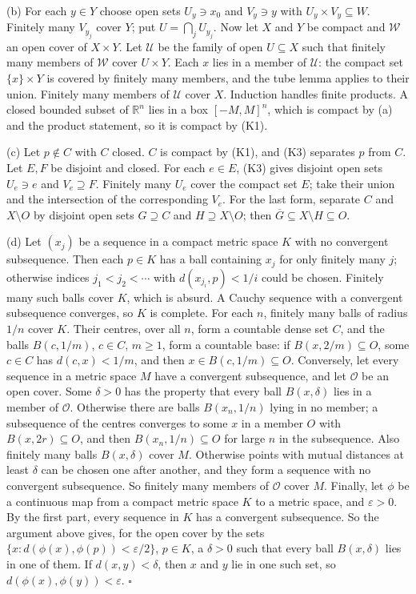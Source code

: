 \documentclass[
  english,
  11pt,
  a4paper,
]{article}
\begin{document}
(b) For each \(y\in Y\) choose open sets \(U_y\ni x_0\) and \(V_y\ni y\)
with \(U_y\times V_y\subseteq W\). Finitely many \(V_{y_j}\) cover
\(Y\); put \(U=\bigcap_jU_{y_j}\). Now let \(X\) and \(Y\) be compact
and \(\mathcal W\) an open cover of \(X\times Y\). Let \(\mathcal U\) be
the family of open \(U\subseteq X\) such that finitely many members of
\(\mathcal W\) cover \(U\times Y\). Each \(x\) lies in a member of
\(\mathcal U\): the compact set \(\{x\}\times Y\) is covered by finitely
many members, and the tube lemma applies to their union. Finitely many
members of \(\mathcal U\) cover \(X\). Induction handles finite
products. A closed bounded subset of \(\mathbb R^n\) lies in a box
\([-M,M]^n\), which is compact by (a) and the product statement, so it
is compact by (K1).

(c) Let \(p\notin C\) with \(C\) closed. \(C\) is compact by (K1), and
(K3) separates \(p\) from \(C\). Let \(E,F\) be disjoint and closed. For
each \(e\in E\), (K3) gives disjoint open sets \(U_e\ni e\) and
\(V_e\supseteq F\). Finitely many \(U_e\) cover the compact set \(E\);
take their union and the intersection of the corresponding \(V_e\). For
the last form, separate \(C\) and \(X\setminus O\) by disjoint open sets
\(G\supseteq C\) and \(H\supseteq X\setminus O\); then
\(\overline G\subseteq X\setminus H\subseteq O\).

(d) Let \((x_j)\) be a sequence in a compact metric space \(K\) with no
convergent subsequence. Then each \(p\in K\) has a ball containing
\(x_j\) for only finitely many \(j\); otherwise indices
\(j_1<j_2<\cdots\) with \(d(x_{j_i},p)<1/i\) could be chosen. Finitely
many such balls cover \(K\), which is absurd. A Cauchy sequence with a
convergent subsequence converges, so \(K\) is complete. For each \(n\),
finitely many balls of radius \(1/n\) cover \(K\). Their centres, over
all \(n\), form a countable dense set \(C\), and the balls \(B(c,1/m)\),
\(c\in C\), \(m\geq1\), form a countable base: if
\(B(x,2/m)\subseteq O\), some \(c\in C\) has \(d(c,x)<1/m\), and then
\(x\in B(c,1/m)\subseteq O\). Conversely, let every sequence in a metric
space \(M\) have a convergent subsequence, and let \(\mathcal O\) be an
open cover. Some \(\delta>0\) has the property that every ball
\(B(x,\delta)\) lies in a member of \(\mathcal O\). Otherwise there are
balls \(B(x_n,1/n)\) lying in no member; a subsequence of the centres
converges to some \(x\) in a member \(O\) with \(B(x,2r)\subseteq O\),
and then \(B(x_n,1/n)\subseteq O\) for large \(n\) in the subsequence.
Also finitely many balls \(B(x,\delta)\) cover \(M\). Otherwise points
with mutual distances at least \(\delta\) can be chosen one after
another, and they form a sequence with no convergent subsequence. So
finitely many members of \(\mathcal O\) cover \(M\). Finally, let
\(\phi\) be a continuous map from a compact metric space \(K\) to a
metric space, and \(\varepsilon>0\). By the first part, every sequence
in \(K\) has a convergent subsequence. So the argument above gives, for
the open cover by the sets \(\{x:d(\phi(x),\phi(p))<\varepsilon/2\}\),
\(p\in K\), a \(\delta>0\) such that every ball \(B(x,\delta)\) lies in
one of them. If \(d(x,y)<\delta\), then \(x\) and \(y\) lie in one such
set, so \(d(\phi(x),\phi(y))<\varepsilon\). \(\square\)
\end{document}
